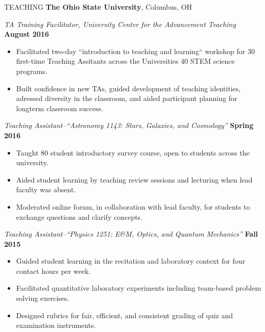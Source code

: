 \documentclass{resume} %
\begin{document}
\begin{rSection}{TEACHING}
{\bf The Ohio State University}, Columbus, OH 

{\em TA Training Facilitator, University Center for the Advancement Teaching} \hfill {\bf August 2016}
\begin{itemize}
\vspace*{-.05in}
\item Facilitated two-day ``introduction to teaching and learning`` workshop for 30 first-time Teaching Assitants across the Universities 40 STEM science programs.
\item Built confidence in new TAs, guided development of teaching identities, adressed diversity in the classroom, and aided participant planning for longterm classroom success.
\end{itemize}
{\em Teaching Assistant--``Astronomy 1143: Stars, Galaxies, and Cosmology''} \hfill {\bf Spring 2016}
\begin{itemize}
\vspace*{-.05in}
\item Taught 80 student introductory survey course, open to students across the university.
\item Aided student learning by teaching review sessions and lecturing when lead faculty was absent.
\item Moderated online forum, in collaboration with lead faculty, for students to exchange questions and clarify concepts.
\end{itemize}
{\em Teaching Assistant--``Physics 1251: E\&M, Optics, and Quantum Mechanics''} \hfill {\bf Fall 2015}
\begin{itemize}
\vspace*{-.05in}
\item Guided student learning in the recitation and laboratory context for four contact hours per week.
\item Facilitated quantitative laboratory experiments including team-based problem solving exercises.
\item Designed rubrics for fair, efficient, and consistent grading of quiz and examination instruments.
\end{itemize}
\end{rSection}
\end{document}
